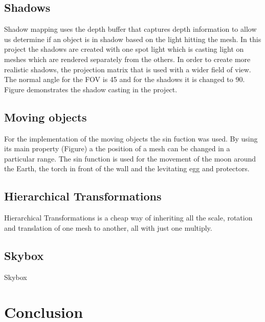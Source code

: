 \documentclass[10pt, a4paper]{article}
\begin{document}
	\subsection{Shadows}
	Shadow mapping uses the depth buffer that captures depth information to allow us determine if an object is in shadow based on the light hitting the mesh. In this project the shadows are created with one spot light which is casting light on meshes which are rendered separately from the others. In order to create more realistic shadows, the projection matrix that is used with a wider field of view. The normal angle for the FOV is 45 and for the shadows it is changed to 90. Figure demonstrates the shadow casting in the project. 
	\subsection{Moving objects}
	For the implementation of the moving objects the sin fuction was used. By using its main property (Figure) a the position of a mesh can be changed in a particular range. The sin function is used for the movement of the moon around the Earth, the torch in front of the wall and the levitating egg and protectors.
	\subsection{Hierarchical Transformations}
	Hierarchical Transformations is a cheap way of inheriting all the scale, rotation and translation of one mesh to another, all with just one multiply.
	\subsection{Skybox}
	Skybox
		
	\section{Conclusion}	


		
\end{document}
